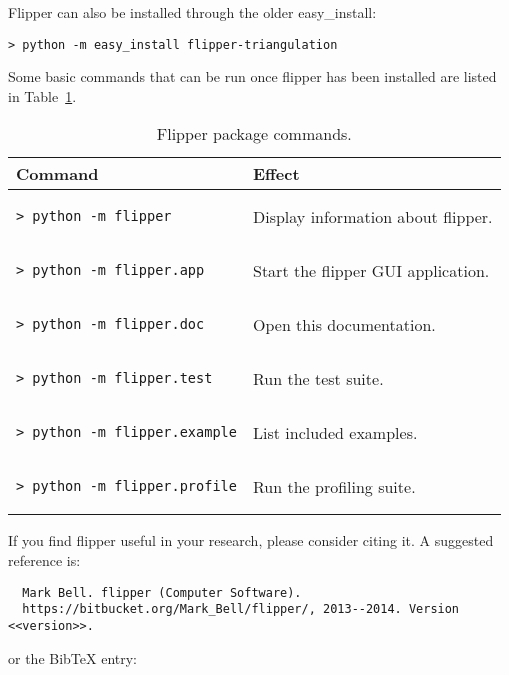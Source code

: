 \documentclass[a4paper]{article}
\begin{document}
Flipper can also be installed through the older easy\_install:
\begin{lstlisting}
> python -m easy_install flipper-triangulation
\end{lstlisting}

Some basic commands that can be run once flipper has been installed are listed in Table~\ref{tbl:package_commands}.

\begin{table}[ht]
\label{tbl:package_commands}
\begin{center}
\begin{tabular}{l|l}
Command & Effect \\
\hline
\begin{lstlisting}
> python -m flipper
\end{lstlisting} & Display information about flipper. \\

\begin{lstlisting}
> python -m flipper.app
\end{lstlisting} & Start the flipper GUI application. \\

\begin{lstlisting}
> python -m flipper.doc
\end{lstlisting} & Open this documentation. \\

\begin{lstlisting}
> python -m flipper.test
\end{lstlisting} & Run the test suite. \\

\begin{lstlisting}
> python -m flipper.example
\end{lstlisting} & List included examples. \\

\begin{lstlisting}
> python -m flipper.profile
\end{lstlisting} & Run the profiling suite. \\
\end{tabular}
\end{center}
\caption{Flipper package commands.}
\end{table}

If you find flipper useful in your research, please consider citing it. A suggested reference is:
\begin{verbatim}
  Mark Bell. flipper (Computer Software).
  https://bitbucket.org/Mark_Bell/flipper/, 2013--2014. Version <<version>>.
\end{verbatim}
or the BibTeX entry:
\end{document}

